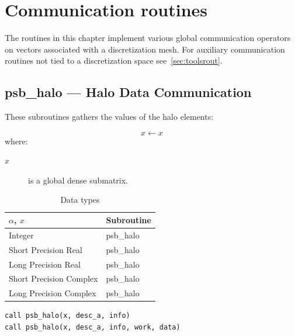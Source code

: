 \section{Communication routines}
%
%
The routines in this chapter implement various global communication operators
on vectors associated with a discretization mesh. For auxiliary communication
routines not tied to a discretization space see~\ref{sec:toolsrout}.

\clearpage\subsection{psb\_halo --- Halo Data Communication}
    

These subroutines gathers the values of the halo
elements:

\[ x \leftarrow x \]
where:
\begin{description}
\item[$x$] is a global dense  submatrix.
\end{description}

\begin{table}[h]
\begin{center}
\begin{tabular}{ll}
\hline
$\alpha$, $x$ & {\bf Subroutine}\\
\hline
Integer           & psb\_halo \\
Short Precision Real & psb\_halo \\
Long Precision Real & psb\_halo \\
Short Precision Complex & psb\_halo \\
Long Precision Complex & psb\_halo \\
\hline
\end{tabular}
\end{center}
\caption{Data types\label{tab:f90halo}}
\end{table}

\begin{lstlisting}
call psb_halo(x, desc_a, info)
call psb_halo(x, desc_a, info, work, data)
\end{lstlisting}


